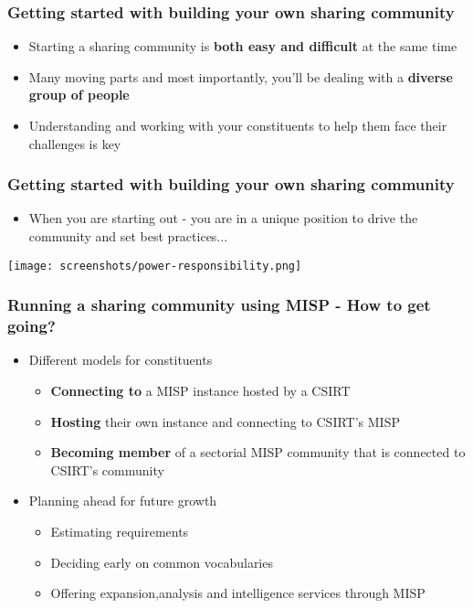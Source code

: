 \begin{frame}
\frametitle{Getting started with building your own sharing community}
\begin{itemize}
	\item Starting a sharing community is {\bf both easy and difficult} at the same time
    \item Many moving parts and most importantly, you'll be dealing with a {\bf diverse group of people}
	\item Understanding and working with your constituents to help them face their challenges is key
\end{itemize}
\end{frame}

\begin{frame}
\frametitle{Getting started with building your own sharing community}
\begin{itemize}
	\item When you are starting out - you are in a unique position to drive the community and set best practices...
\end{itemize}
\texttt{[image: screenshots/power-responsibility.png]}
\end{frame}

\begin{frame}
\frametitle{Running a sharing community using MISP - How to get going?}
\begin{itemize}
	\item Different models for constituents
	\begin{itemize}
        \item {\bf Connecting to} a MISP instance hosted by a CSIRT
        \item {\bf Hosting} their own instance and connecting to CSIRT's MISP
        \item {\bf Becoming member} of a sectorial MISP community that is connected to CSIRT's community
	\end{itemize}
	\item Planning ahead for future growth
	\begin{itemize}
		\item Estimating requirements
		\item Deciding early on common vocabularies
		\item Offering expansion,analysis and intelligence services through MISP
	\end{itemize}
\end{itemize}
\end{frame}

